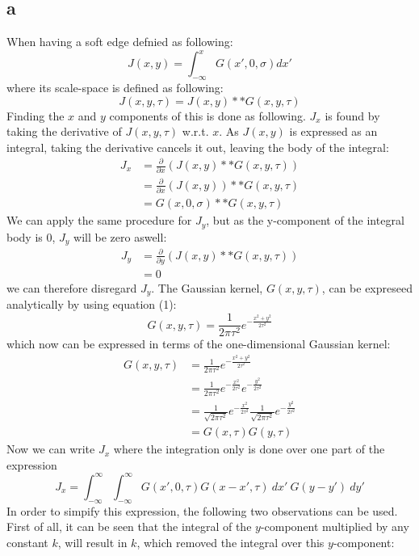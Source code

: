 \documentclass[a4paper]{article}
\begin{document}
\subsection*{a}
When having a soft edge defnied as following:
$$
  J(x,y)=\int^{x}_{-\infty} G(x',0,\sigma)dx'
$$
where its scale-space is defined as following:
$$
  J(x,y,\tau)=J(x,y)**G(x,y,\tau)
$$
Finding the $x$ and $y$ components of this is done as following. $J_x$ is found by taking the derivative of $J(x,y,\tau)$ w.r.t. $x$. As $J(x,y)$ is expressed as an integral, taking the derivative cancels it out, leaving the body of the integral:
\begin{align*}
  J_x &= \frac{\partial}{\partial x}(J(x,y) ** G(x,y,\tau)) \\
      &= \frac{\partial}{\partial x} (J(x,y)) ** G(x,y,\tau) \\
      &= G(x,0,\sigma) ** G(x,y,\tau)
\end{align*}
We can apply the same procedure for $J_y$, but as the y-component of the integral body is $0$, $J_y$ will be zero aswell:
\begin{align*}
  J_y &= \frac{\partial}{\partial y}(J(x,y) ** G(x,y,\tau)) \\
      &= 0
\end{align*}
we can therefore disregard $J_y$. The Gaussian kernel, $G(x,y,\tau)$, can be expreseed analytically by using equation (1):
$$
  G(x,y,\tau) = \frac{1}{2\pi \tau^2} e^{-\frac{x^2+y^2}{2\tau^2} }
$$
which now can be expressed in terms of the one-dimensional Gaussian kernel:
\begin{align*}
  G(x,y,\tau) &= \frac{1}{2\pi \tau^2} e^{-\frac{x^2+y^2}{2\tau^2} } \\
              &= \frac{1}{2\pi \tau^2} e^{-\frac{x^2}{2\tau^2} } e^{-\frac{y^2}{2\tau^2} }\\
              &= \frac{1}{\sqrt{2\pi \tau^2}} e^{-\frac{x^2}{2\tau^2} } \frac{1}{\sqrt{2\pi \tau^2}} e^{-\frac{y^2}{2\tau^2} }\\
              &= G(x,\tau)G(y,\tau)
\end{align*}
Now we can write $J_x$ where the integration only is done over one part of the expression
$$
J_x = \int_{-\infty}^{\infty}\int_{-\infty}^{\infty} G(x', 0,\tau) G(x-x',\tau) \:dx' \: G(y-y')\: dy'
$$
In order to simpify this expression, the following two observations can be used. \\
First of all, it can be seen that the integral of the $y$-component multiplied by any constant $k$,  will result in $k$, which removed the integral over this $y$-component:
\end{document}
